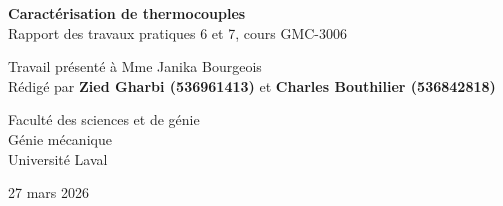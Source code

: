 \documentclass[11pt,twoside]{article}
\numberwithin{figure}{section}
\begin{document}
\begin{titlepage}
\centering

\vspace*{1cm}

{\Large \textbf{Caractérisation de thermocouples}} \\[0.5cm]
{\large Rapport des travaux pratiques 6 et 7, cours GMC-3006} \\[0.5cm]


\vfill

Travail présenté à Mme Janika Bourgeois \\ [0.25cm]
Rédigé par \textbf{Zied Gharbi (536961413)} et \textbf{Charles Bouthilier (536842818)}

\vfill

Faculté des sciences et de génie \\ [0.25cm]
Génie mécanique \\ [0.25cm]
Université Laval

\vspace{0.5cm}

27 mars 2026

\end{titlepage}

\tableofcontents
\newpage


\newpage
{}
\thispagestyle{empty}
\end{document}

